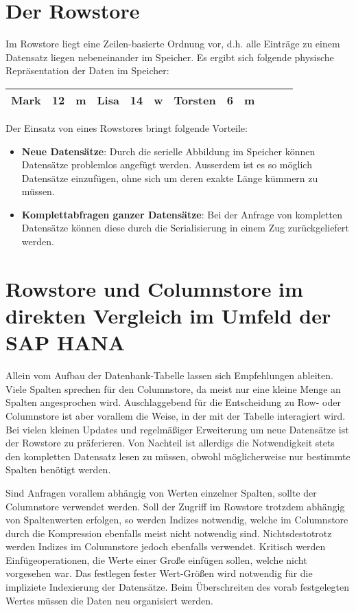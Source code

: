 \section{Der Rowstore}
Im Rowstore liegt eine Zeilen-basierte Ordnung vor, d.h. alle Einträge zu einem Datensatz liegen nebeneinander im Speicher. Es ergibt sich folgende physische Repräsentation der Daten im Speicher:

\begin{center}
    \begin{tabular}{ | l | l | l | l | l | l | l | l | l | l | l | l |}
    \hline
    Mark & 12 & m & Lisa & 14 & w & Torsten & 6 & m \\ \hline
    \end{tabular}
\end{center}

Der Einsatz von eines Rowstores bringt folgende Vorteile: 

\begin{itemize}
    \item \textbf{Neue Datensätze}: Durch die serielle Abbildung im Speicher können Datensätze problemlos angefügt werden. Ausserdem ist es so möglich Datensätze einzufügen, ohne sich um deren exakte Länge kümmern zu müssen.
    \item \textbf{Komplettabfragen ganzer Datensätze}: Bei der Anfrage von kompletten Datensätze können diese durch die Serialisierung in einem Zug zurückgeliefert werden. 
\end{itemize}

\section{Rowstore und Columnstore im direkten Vergleich im Umfeld der SAP HANA}

Allein vom Aufbau der Datenbank-Tabelle lassen sich Empfehlungen ableiten. Viele Spalten sprechen für den Columnstore, da meist nur eine kleine Menge an Spalten angesprochen wird. 
Auschlaggebend für die Entscheidung zu Row- oder Columnstore ist aber vorallem die Weise, in der mit der Tabelle interagiert wird. Bei vielen kleinen Updates und regelmäßiger Erweiterung um neue Datensätze ist der Rowstore zu präferieren. Von Nachteil ist allerdigs die Notwendigkeit stets den kompletten Datensatz lesen zu müssen, obwohl möglicherweise nur bestimmte Spalten benötigt werden. 

Sind Anfragen vorallem abhängig von Werten einzelner Spalten, sollte der Columnstore verwendet werden. Soll der Zugriff im Rowstore trotzdem abhängig von Spaltenwerten erfolgen, so werden Indizes notwendig, welche im Columnstore durch die Kompression ebenfalls meist nicht notwendig sind. Nichtsdestotrotz werden Indizes im Columnstore jedoch ebenfalls verwendet. Kritisch werden Einfügeoperationen, die Werte einer Große einfügen sollen, welche nicht vorgesehen war. Das festlegen fester Wert-Größen wird notwendig für die impliziete Indexierung der Datensätze. Beim Überschreiten des vorab festgelegten Wertes müssen die Daten neu organisiert werden. 

